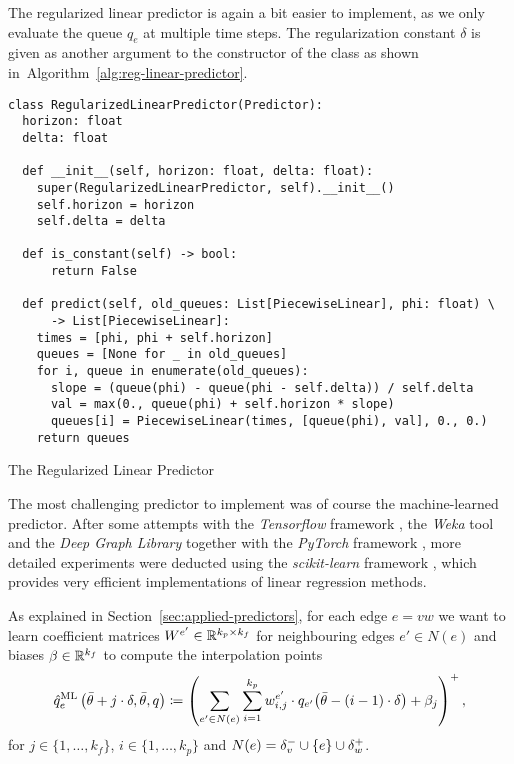 The regularized linear predictor is again a bit easier to implement, as we only evaluate the queue $q_e$ at multiple time steps.
The regularization constant $\delta$ is given as another argument to the constructor of the class as shown in~Algorithm~\ref{alg:reg-linear-predictor}.

\begin{algorithm}[H]
  \begin{verbatim}
class RegularizedLinearPredictor(Predictor):
  horizon: float
  delta: float

  def __init__(self, horizon: float, delta: float):
    super(RegularizedLinearPredictor, self).__init__()
    self.horizon = horizon
    self.delta = delta

  def is_constant(self) -> bool:
      return False

  def predict(self, old_queues: List[PiecewiseLinear], phi: float) \
      -> List[PiecewiseLinear]:
    times = [phi, phi + self.horizon]
    queues = [None for _ in old_queues]
    for i, queue in enumerate(old_queues):
      slope = (queue(phi) - queue(phi - self.delta)) / self.delta
      val = max(0., queue(phi) + self.horizon * slope)
      queues[i] = PiecewiseLinear(times, [queue(phi), val], 0., 0.)
    return queues
  \end{verbatim}
  \caption{The Regularized Linear Predictor}
  \label{alg:reg-linear-predictor}
\end{algorithm}

The most challenging predictor to implement was of course the machine-learned predictor.
After some attempts with the \emph{Tensorflow} framework \cite{tensorflow}, the \emph{Weka} tool \cite{frank2005weka} and the \emph{Deep Graph Library} \cite{dgl} together with the \emph{PyTorch} framework \cite{pytorch}, more detailed experiments were deducted using the \emph{scikit-learn} framework \cite{scikit-learn}, which provides very efficient implementations of linear regression methods.

As explained in Section~\ref{sec:applied-predictors}, for each edge $e=vw$ we want to learn coefficient matrices $W^{e'} \in \mathbb{R}^{k_p \times k_f}$ for neighbouring edges $e'\in N(e)$ and biases $\beta\in\mathbb{R}^{k_f}$ to compute the interpolation points \[
  \hat q^{\text{ML}}_e\left(\bar\theta + j\cdot\delta,\bar\theta,q \right) \coloneqq 
  \left(
  \sum_{e'\in N(e)} \sum_{i = 1}^{k_p} w^{e'}_{i, j} \cdot {q_{e'}}{\left( 
      \bar\theta - (i-1)\cdot\delta
  \right)}
  + \beta_j
  \right)^+,
\]
for $j\in\{1,\dots,k_f\}$, $i\in\{1,\dots,k_p\}$ and $N(e) = \delta^-_{v} \cup \{e\} \cup \delta^+_{w}$.

